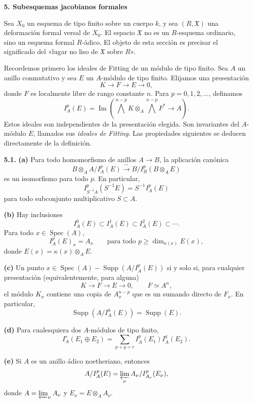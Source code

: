\par\bigskip
\noindent\textbf{5. Subesquemas jacobianos formales}

\medskip
Sea $X_0$ un esquema de tipo finito sobre un cuerpo $k$, y sea
$(R,\mathfrak X)$ una deformación formal versal de $X_0$. El espacio
$\mathfrak X$ no es un $R$-esquema ordinario, sino un esquema formal
$R$-ádico. El objeto de esta sección es precisar el significado del
«lugar no liso de $\mathfrak X$ sobre $R$».

Recordemos primero los ideales de Fitting de un módulo de tipo finito.
Sea $A$ un anillo conmutativo y sea $E$ un $A$-módulo de tipo finito.
Elijamos una presentación
\[
K\longrightarrow F\longrightarrow E\longrightarrow0,
\]
donde $F$ es localmente libre de rango constante $n$. Para
$p=0,1,2,\ldots$, definamos
\[
I_A^p(E)=\operatorname{Im}\left(
 \bigwedge^{n-p}K\otimes_A\bigwedge^{n-p}F^*
 \longrightarrow A\right).
\]
Estos ideales son independientes de la presentación elegida. Son
invariantes del $A$-módulo $E$, llamados sus \emph{ideales de
Fitting}. Las propiedades siguientes se deducen directamente de la
definición.

\medskip
\noindent\textbf{5.1.}
\textbf{(a)} Para todo homomorfismo de anillos
$A\longrightarrow B$, la aplicación canónica
\[
B\otimes_A A/I_A^p(E)
\xrightarrow{\ \sim\ }
B/I_B^p(B\otimes_AE)
\]
es un isomorfismo para todo $p$. En particular,
\[
I_{S^{-1}A}^p(S^{-1}E)=S^{-1}I_A^p(E)
\]
para todo subconjunto multiplicativo $S\subset A$.


\smallskip
\noindent\textbf{(b)} Hay inclusiones
\[
I_A^0(E)\subset I_A^1(E)\subset I_A^2(E)\subset\cdots.
\]
Para todo $x\in\operatorname{Spec}(A)$,
\[
I_A^p(E)_x=A_x
\qquad\text{para todo }p\geq\dim_{\kappa(x)}E(x),
\]
donde $E(x)=\kappa(x)\otimes_AE$.

\smallskip
\noindent\textbf{(c)} Un punto
$x\in\operatorname{Spec}(A)-\operatorname{Supp}(A/I_A^p(E))$ si y
solo si, para cualquier presentación (equivalentemente, para alguna)
\[
K\longrightarrow F\longrightarrow E\longrightarrow0,
\qquad F\simeq A^n,
\]
el módulo $K_x$ contiene una copia de $A_x^{n-p}$ que es un sumando
directo de $F_x$. En particular,
\[
\operatorname{Supp}(A/I_A^0(E))=\operatorname{Supp}(E).
\]

\smallskip
\noindent\textbf{(d)} Para cualesquiera dos $A$-módulos de tipo
finito,
\[
I_A^r(E_1\oplus E_2)
=\sum_{p+q=r}I_A^p(E_1)I_A^q(E_2).
\]

\smallskip
\noindent\textbf{(e)} Si $A$ es un anillo ádico noetheriano,
entonces
\[
A/I_A^p(E)=\varprojlim_\nu A_\nu/I_{A_\nu}^p(E_\nu),
\]
donde $A=\varprojlim_\nu A_\nu$ y $E_\nu=E\otimes_AA_\nu$.

